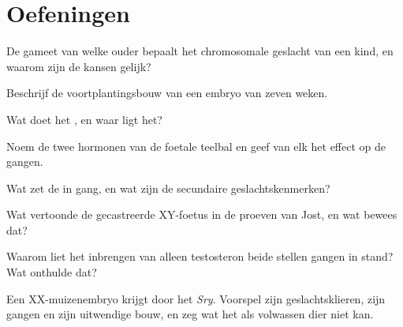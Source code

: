 \section{Oefeningen}

\begin{exercise}[$\star$]\label{exo:g11:becoming-male-female:1}
De gameet van welke ouder bepaalt het chromosomale geslacht van een kind,
en waarom zijn de kansen gelijk?
\end{exercise}

\begin{exercise}[$\star$]\label{exo:g11:becoming-male-female:2}
Beschrijf de voortplantingsbouw van een embryo van zeven weken.
\end{exercise}

\begin{exercise}[$\star$]\label{exo:g11:becoming-male-female:3}
Wat doet het , en waar ligt het?
\end{exercise}

\begin{exercise}[$\star$]\label{exo:g11:becoming-male-female:4}
Noem de twee hormonen van de foetale teelbal en geef van elk het effect
op de gangen.
\end{exercise}

\begin{exercise}[$\star$]\label{exo:g11:becoming-male-female:5}
Wat zet de  in gang, en wat zijn de secundaire
geslachtskenmerken?
\end{exercise}

\begin{exercise}[$\star\star$]\label{exo:g11:becoming-male-female:6}
Wat vertoonde de gecastreerde XY-foetus in de proeven van Jost, en wat
bewees dat?
\end{exercise}

\begin{exercise}[$\star\star$]\label{exo:g11:becoming-male-female:7}
Waarom liet het inbrengen van alleen testosteron beide stellen gangen in
stand? Wat onthulde dat?
\end{exercise}

\begin{exercise}[$\star\star$]\label{exo:g11:becoming-male-female:8}
Een XX-muizenembryo krijgt door  het  \emph{Sry}. Voorspel
zijn geslachtsklieren, zijn gangen en zijn uitwendige bouw, en zeg wat
het als volwassen dier niet kan.
\end{exercise}

